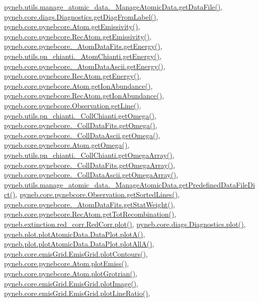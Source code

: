 \hyperlink{manage__atomic__data_8py_source_l00297}{pyneb.\+utils.\+manage\+\_\+atomic\+\_\+data.\+\_\+\+Manage\+Atomic\+Data.\+get\+Data\+File()}, \hyperlink{diags_8py_source_l00183}{pyneb.\+core.\+diags.\+Diagnostics.\+get\+Diag\+From\+Label()}, \hyperlink{pynebcore_8py_source_l01716}{pyneb.\+core.\+pynebcore.\+Atom.\+get\+Emissivity()}, \hyperlink{pynebcore_8py_source_l02873}{pyneb.\+core.\+pynebcore.\+Rec\+Atom.\+get\+Emissivity()}, \hyperlink{pynebcore_8py_source_l00268}{pyneb.\+core.\+pynebcore.\+\_\+\+Atom\+Data\+Fits.\+get\+Energy()}, \hyperlink{pn__chianti_8py_source_l00346}{pyneb.\+utils.\+pn\+\_\+chianti.\+\_\+\+Atom\+Chianti.\+get\+Energy()}, \hyperlink{pynebcore_8py_source_l00525}{pyneb.\+core.\+pynebcore.\+\_\+\+Atom\+Data\+Ascii.\+get\+Energy()}, \hyperlink{pynebcore_8py_source_l02811}{pyneb.\+core.\+pynebcore.\+Rec\+Atom.\+get\+Energy()}, \hyperlink{pynebcore_8py_source_l02110}{pyneb.\+core.\+pynebcore.\+Atom.\+get\+Ion\+Abundance()}, \hyperlink{pynebcore_8py_source_l02961}{pyneb.\+core.\+pynebcore.\+Rec\+Atom.\+get\+Ion\+Abundance()}, \hyperlink{pynebcore_8py_source_l03543}{pyneb.\+core.\+pynebcore.\+Observation.\+get\+Line()}, \hyperlink{pn__chianti_8py_source_l00484}{pyneb.\+utils.\+pn\+\_\+chianti.\+\_\+\+Coll\+Chianti.\+get\+Omega()}, \hyperlink{pynebcore_8py_source_l00811}{pyneb.\+core.\+pynebcore.\+\_\+\+Coll\+Data\+Fits.\+get\+Omega()}, \hyperlink{pynebcore_8py_source_l01063}{pyneb.\+core.\+pynebcore.\+\_\+\+Coll\+Data\+Ascii.\+get\+Omega()}, \hyperlink{pynebcore_8py_source_l01262}{pyneb.\+core.\+pynebcore.\+Atom.\+get\+Omega()}, \hyperlink{pn__chianti_8py_source_l00461}{pyneb.\+utils.\+pn\+\_\+chianti.\+\_\+\+Coll\+Chianti.\+get\+Omega\+Array()}, \hyperlink{pynebcore_8py_source_l00783}{pyneb.\+core.\+pynebcore.\+\_\+\+Coll\+Data\+Fits.\+get\+Omega\+Array()}, \hyperlink{pynebcore_8py_source_l01039}{pyneb.\+core.\+pynebcore.\+\_\+\+Coll\+Data\+Ascii.\+get\+Omega\+Array()}, \hyperlink{manage__atomic__data_8py_source_l00034}{pyneb.\+utils.\+manage\+\_\+atomic\+\_\+data.\+\_\+\+Manage\+Atomic\+Data.\+get\+Predefined\+Data\+File\+Dict()}, \hyperlink{pynebcore_8py_source_l03562}{pyneb.\+core.\+pynebcore.\+Observation.\+get\+Sorted\+Lines()}, \hyperlink{pynebcore_8py_source_l00242}{pyneb.\+core.\+pynebcore.\+\_\+\+Atom\+Data\+Fits.\+get\+Stat\+Weight()}, \hyperlink{pynebcore_8py_source_l02735}{pyneb.\+core.\+pynebcore.\+Rec\+Atom.\+get\+Tot\+Recombination()}, \hyperlink{red__corr_8py_source_l00303}{pyneb.\+extinction.\+red\+\_\+corr.\+Red\+Corr.\+plot()}, \hyperlink{diags_8py_source_l00421}{pyneb.\+core.\+diags.\+Diagnostics.\+plot()}, \hyperlink{plot_atomic_data_8py_source_l00116}{pyneb.\+plot.\+plot\+Atomic\+Data.\+Data\+Plot.\+plot\+A()}, \hyperlink{plot_atomic_data_8py_source_l00188}{pyneb.\+plot.\+plot\+Atomic\+Data.\+Data\+Plot.\+plot\+All\+A()}, \hyperlink{emis_grid_8py_source_l00179}{pyneb.\+core.\+emis\+Grid.\+Emis\+Grid.\+plot\+Contours()}, \hyperlink{pynebcore_8py_source_l02313}{pyneb.\+core.\+pynebcore.\+Atom.\+plot\+Emiss()}, \hyperlink{pynebcore_8py_source_l02372}{pyneb.\+core.\+pynebcore.\+Atom.\+plot\+Grotrian()}, \hyperlink{emis_grid_8py_source_l00137}{pyneb.\+core.\+emis\+Grid.\+Emis\+Grid.\+plot\+Image()}, \hyperlink{emis_grid_8py_source_l00238}{pyneb.\+core.\+emis\+Grid.\+Emis\+Grid.\+plot\+Line\+Ratio()}, 